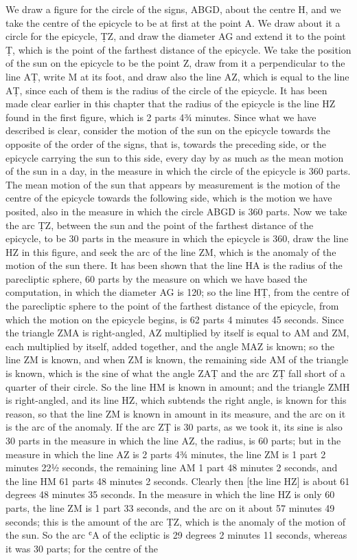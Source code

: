 \documentclass[11pt]{article}
\newcommand{\ArPage}[1]{\marginpar{\footnotesize\color{gray}Ar.\,p.\,#1}}
\begin{document}
\par \ArPage{69}We draw a figure for the circle of the signs, ABGD, about the centre H, and we take the centre of the epicycle to be at first at the point A. We draw about it a circle for the epicycle, ṬZ, and draw the diameter AG and extend it to the point Ṭ, which is the point of the farthest distance of the epicycle. We take the position of the sun on the epicycle to be the point Z, draw from it a perpendicular to the line AṬ, write M at its foot, and draw also the line AZ, which is equal to the line AṬ, since each of them is the radius of the circle of the epicycle. It has been made clear earlier in this chapter that the radius of the epicycle is the line HZ found in the first figure, which is 2 parts 4¾ minutes. Since what we have described is clear, consider the motion of the sun on the epicycle towards the opposite of the order of the signs, that is, towards the preceding side, or the epicycle carrying the sun to this side, every day by as much as the mean motion of the sun in a day, in the measure in which the circle of the epicycle is 360 parts. The mean motion of the sun that appears by measurement is the motion of the centre of the epicycle towards the following side, which is the motion we have posited, also in the measure in which the circle ABGD is 360 parts. Now we take the arc ṬZ, between the sun and the point of the farthest distance of the epicycle, to be 30 parts in the measure in which the epicycle is 360, draw the line HZ in this figure, and seek the arc of the line ZM, which is the anomaly of the motion of the sun there. It has been shown that the line HA is the radius of the parecliptic sphere, 60 parts by the measure on which we have based the computation, in which the diameter AG is 120; so the line HṬ, from the centre of the parecliptic sphere to the point of the farthest distance of the epicycle, from which the motion on the epicycle begins, is 62 parts 4 minutes 45 seconds. Since the triangle ZMA is right-angled, AZ multiplied by itself is equal to AM and ZM, each multiplied by itself, added together, and the angle MAZ is known; so the line ZM is known, and when ZM is known, the remaining side AM of the triangle is known, which is the sine of what the angle ZAṬ and the arc ZṬ fall short of a quarter of their circle. So the line HM is known in amount; and the triangle ZMH is right-angled, and its line HZ, which subtends the right angle, is known for this reason, so that the line ZM is known in amount in its measure, and the arc on it is the arc of the anomaly. If the arc ZṬ is 30 parts, as we took it, its sine is also 30 parts in the measure in which the line AZ, the radius, is 60 parts; but in the measure in which the line AZ is 2 parts 4¾ minutes, the line ZM is 1 part 2 minutes 22½ seconds, the remaining line AM 1 part 48 minutes 2 seconds, and the line HM 61 parts 48 minutes 2 seconds. Clearly then [the line HZ] is about 61 degrees 48 minutes 35 seconds. In the measure in which the line HZ is only 60 parts, the line ZM is 1 part 33 seconds, and the arc on it about 57 minutes 49 seconds; this is the amount of the arc ṬZ, which is the anomaly of the motion of the sun. So the arc ʿA of the ecliptic is 29 degrees 2 minutes 11 seconds, whereas it was 30 parts; for the centre of the 
\end{document}
